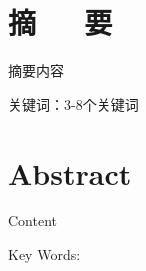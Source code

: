 \chapter*{摘~~~要}

摘要内容

\vspace{1.5\ccwd}

关键词：3-8个关键词 

\chapter*{\textbf{Abstract}}

Content

\vspace{1.5\ccwd}

Key Words: 
